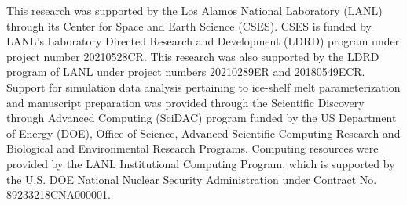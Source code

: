 \documentclass[tc, manuscript]{copernicus}
\begin{document}

\begin{acknowledgements}
This research was supported by the Los Alamos National
Laboratory (LANL) through its Center for Space and Earth Science
(CSES). CSES is funded by LANL’s Laboratory Directed Research
and Development (LDRD) program under project number
20210528CR. This research was also supported by the LDRD program of LANL under project numbers 20210289ER and 20180549ECR. Support for simulation data analysis pertaining to ice-shelf melt parameterization and manuscript preparation was provided through the Scientific Discovery through Advanced Computing (SciDAC) program funded by the US Department of Energy (DOE), Office of Science, Advanced Scientific Computing Research and Biological and Environmental Research Programs. Computing resources were provided by the LANL Institutional Computing Program, which is supported by the U.S. DOE National Nuclear Security Administration under Contract No. 89233218CNA000001. 
\end{acknowledgements}



\end{document}

